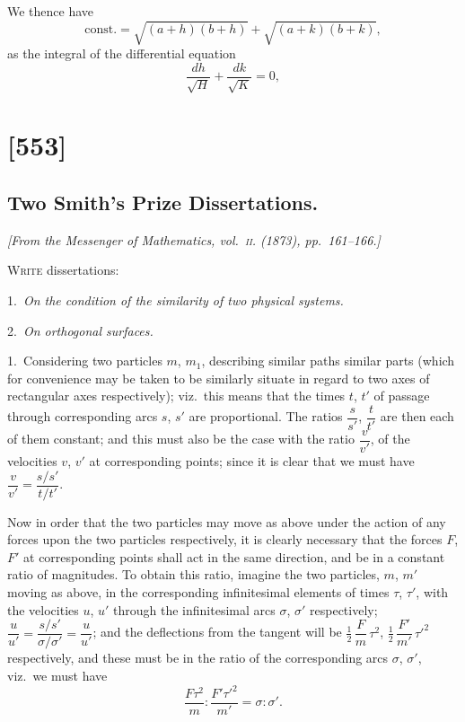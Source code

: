 \documentclass[11pt,a4paper]{article}
\theoremstyle{plain}
\theoremstyle{definition}
\begin{document}
We thence have
\[
\mathrm{const.} = \sqrt{(a + h)(b + h)} + \sqrt{(a + k)(b + k)},
\]
as the integral of the differential equation
\[
\frac{dh}{\sqrt{H}} + \frac{dk}{\sqrt{K}} = 0,
\]

\clearpage

\section{[553]}
\subsection{Two Smith's Prize Dissertations.}

\begin{center}
\textit{[From the Messenger of Mathematics, vol.~\textsc{ii}. (1873), pp.~161--166.]}
\end{center}

\textsc{Write} dissertations:

1.\ \textit{On the condition of the similarity of two physical systems.}

2.\ \textit{On orthogonal surfaces.}

1.\ Considering two particles $m$, $m_1$, describing similar paths similar parts
(which for convenience may be taken to be similarly situate in regard to two axes of
rectangular axes respectively); viz.\ this means that the times $t$, $t'$ of passage through
corresponding arcs $s$, $s'$ are proportional. The ratios $\dfrac{s}{s'}$, $\dfrac{t}{t'}$ are then each of them
constant; and this must also be the case with the ratio $\dfrac{v}{v'}$, of the velocities $v$, $v'$ at
corresponding points; since it is clear that we must have $\dfrac{v}{v'} = \dfrac{s/s'}{t/t'}$.

Now in order that the two particles may move as above under the action of
any forces upon the two particles respectively, it is clearly necessary that the forces
$F$, $F'$ at corresponding points shall act in the same direction, and be in a constant
ratio of magnitudes. To obtain this ratio, imagine the two particles, $m$, $m'$
moving as above, in the corresponding infinitesimal elements of times $\tau$, $\tau'$, with the
velocities $u$, $u'$ through the infinitesimal arcs $\sigma$, $\sigma'$ respectively; $\dfrac{u}{u'} = \dfrac{s/s'}{\sigma/\sigma'} = \dfrac{u}{u'}$; and the
deflections from the tangent will be $\tfrac{1}{2}\,\dfrac{F}{m}\,\tau^2$, $\tfrac{1}{2}\,\dfrac{F'}{m'}\,\tau'^2$ respectively, and these must
be in the ratio of the corresponding arcs $\sigma$, $\sigma'$, viz.\ we must have
\[
\frac{F\tau^2}{m} : \frac{F'\tau'^2}{m'} = \sigma : \sigma'.
\]
\end{document}
